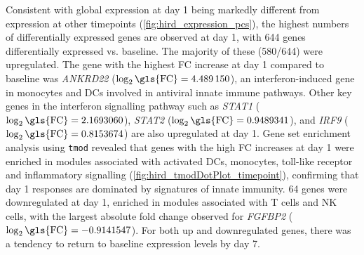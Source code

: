 Consistent with global expression at day 1 being markedly different from expression at other timepoints (\autoref{fig:hird_expression_pcs}), the highest numbers of differentially expressed genes are observed at day 1, with 644 genes differentially expressed vs. baseline.
The majority of these (580/644) were upregulated.
The gene with the highest \gls{FC} increase at day 1 compared to baseline was \textit{ANKRD22} ($\log_2\text{\gls{FC}} = \num{4.489150}$), an interferon-induced gene in monocytes and \glspl{DC} involved in antiviral innate immune pathways\autocite{bin2016AnkyrinRepeatDomain}.
Other key genes in the interferon signalling pathway\autocite{schneider2014InterferonStimulatedGenesComplex} such as \textit{STAT1} ($\log_2\text{\gls{FC}} = 2.1693060$), \textit{STAT2}   ($\log_2\text{\gls{FC}} = 0.9489341$), and \textit{IRF9} ($\log_2\text{\gls{FC}} = 0.8153674$) are also upregulated at day 1.
Gene set enrichment analysis using \texttt{tmod} revealed that genes with the high \gls{FC} increases at day 1 were enriched in modules associated with activated \glspl{DC}, monocytes, toll-like receptor and inflammatory signalling (\autoref{fig:hird_tmodDotPlot_timepoint}), confirming that day 1 responses are dominated by signatures of innate immunity.
64 genes were downregulated at day 1, enriched in modules associated with T cells and \gls{NK} cells, with the largest absolute fold change observed for \textit{FGFBP2} ($\log_2\text{\gls{FC}} = -0.9141547$).
For both up and downregulated genes, there was a tendency to return to baseline expression levels by day 7.

